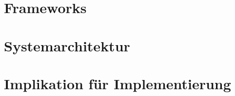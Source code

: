 
\section{Frameworks}

\section{Systemarchitektur}












\section{Implikation für Implementierung}


